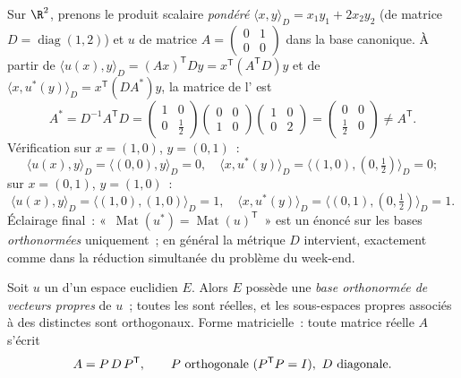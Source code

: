 \begin{example}\label{ex:b2:quadratic:weightedadjoint}
Sur $\R^2$, prenons le produit scalaire \emph{pondéré} $\langle x,
y\rangle_D = x_1y_1 + 2x_2y_2$ (de matrice $D =
\operatorname{diag}(1,2)$) et $u$ de matrice $A =
\begin{pmatrix} 0 & 1\\ 0 & 0\end{pmatrix}$ dans la base
canonique. À partir de $\langle u(x), y\rangle_D = (Ax)^{\mathsf
T}Dy = x^{\mathsf T}(A^{\mathsf T}D)y$ et de $\langle x,
u^*(y)\rangle_D = x^{\mathsf T}(DA^*)y$, la matrice de l' est
\[
A^* = D^{-1}A^{\mathsf T}D
= \begin{pmatrix} 1 & 0\\ 0 & \tfrac12\end{pmatrix}
\begin{pmatrix} 0 & 0\\ 1 & 0\end{pmatrix}
\begin{pmatrix} 1 & 0\\ 0 & 2\end{pmatrix}
= \begin{pmatrix} 0 & 0\\ \tfrac12 & 0\end{pmatrix}
\neq A^{\mathsf T} .
\]
Vérification sur $x = (1,0)$, $y = (0,1)$~:
\[
\langle u(x), y\rangle_D = \langle (0,0), y\rangle_D = 0,
\quad
\langle x, u^*(y)\rangle_D
= \langle(1,0), (0,\tfrac12)\rangle_D = 0 ;
\]
sur $x = (0,1)$, $y = (1,0)$~:
\[
\langle u(x), y\rangle_D = \langle(1,0),(1,0)\rangle_D = 1,
\quad
\langle x, u^*(y)\rangle_D =
\langle(0,1),(0,\tfrac12)\rangle_D = 1 .
\] Éclairage final~: «~$\operatorname{Mat}(u^*)
= \operatorname{Mat}(u)^{\mathsf T}$~» est un énoncé sur les bases
\emph{orthonormées} uniquement~; en général la métrique $D$
intervient, exactement comme dans la réduction simultanée du
problème du week-end.
\end{example}

\begin{theorem}\label{thm:b2:quadratic:spectral}
Soit $u$ un  d'un espace euclidien $E$.
Alors $E$ possède une \emph{base orthonormée de vecteurs propres} de
$u$~; toutes les  sont réelles, et les sous-espaces
propres associés à des  distinctes sont orthogonaux.
Forme matricielle~: toute matrice  réelle $A$ s'écrit
\[
A = P\,D\,P^{\mathsf T},
\qquad P \text{ orthogonale } (P^{\mathsf T} P = I),\ D
\text{ diagonale}.\index{théorème spectral}
\]
\end{theorem}

